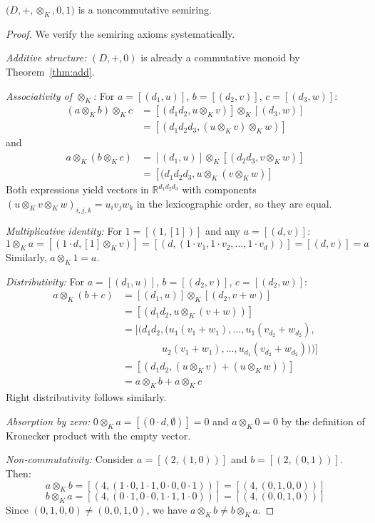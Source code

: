 \begin{theorem}
\(\bigl(D,+,\otimes_K,0,1\bigr)\) is a non\-commutative semiring.
\end{theorem}
\begin{proof}
We verify the semiring axioms systematically.

\textit{Additive structure:} $(D,+,0)$ is already a commutative monoid by Theorem~\ref{thm:add}.

\textit{Associativity of $\otimes_K$:} For $a = [(d_1,u)]$, $b = [(d_2,v)]$, $c = [(d_3,w)] $:
\begin{align}
(a \otimes_K b) \otimes_K c &= [(d_1 d_2, u \otimes_K v)] \otimes_K [(d_3,w)] \\
&= [(d_1 d_2 d_3, (u \otimes_K v) \otimes_K w)]
\end{align}
and
\begin{align}
a \otimes_K (b \otimes_K c) &= [(d_1,u)] \otimes_K [(d_2 d_3, v \otimes_K w)] \\
&= [(d_1 d_2 d_3, u \otimes_K (v \otimes_K w)]
\end{align}
Both expressions yield vectors in $\mathbb{R}^{d_1 d_2 d_3}$ with components $(u \otimes_K v \otimes_K w)_{i,j,k} = u_i v_j w_k$ in the lexicographic order, so they are equal.

\textit{Multiplicative identity:} For $1 = [(1,[1])]$ and any $a = [(d,v)] $:
\[1 \otimes_K a = [(1 \cdot d, [1] \otimes_K v)] = [(d, (1 \cdot v_1, 1 \cdot v_2, \ldots, 1 \cdot v_d))] = [(d,v)] = a\]
Similarly, $a \otimes_K 1 = a$.

\textit{Distributivity:} For $a = [(d_1,u)]$, $b = [(d_2,v)]$, $c = [(d_2,w)] $:
\begin{align}
a \otimes_K (b + c) &= [(d_1,u)] \otimes_K [(d_2, v + w)] \\
&= [(d_1 d_2, u \otimes_K (v + w))] \\
&= [(d_1 d_2, (u_1(v_1 + w_1), \ldots, u_1(v_{d_2} + w_{d_2}), \\
&\qquad\qquad u_2(v_1 + w_1), \ldots, u_{d_1}(v_{d_2} + w_{d_2})))] \\
&= [(d_1 d_2, (u \otimes_K v) + (u \otimes_K w))] \\
&= a \otimes_K b + a \otimes_K c
\end{align}
Right distributivity follows similarly.

\textit{Absorption by zero:} $0 \otimes_K a = [(0 \cdot d, \emptyset)] = 0$ and $a \otimes_K 0 = 0$ by the definition of Kronecker product with the empty vector.

\textit{Non-commutativity:} Consider $a = [(2, (1,0))]$ and $b = [(2, (0,1))]$. Then:
\[a \otimes_K b = [(4, (1 \cdot 0, 1 \cdot 1, 0 \cdot 0, 0 \cdot 1))] = [(4, (0,1,0,0))]\]
\[b \otimes_K a = [(4, (0 \cdot 1, 0 \cdot 0, 1 \cdot 1, 1 \cdot 0))] = [(4, (0,0,1,0))]\]
Since $(0,1,0,0) \neq (0,0,1,0)$, we have $a \otimes_K b \neq b \otimes_K a$.
\end{proof}

